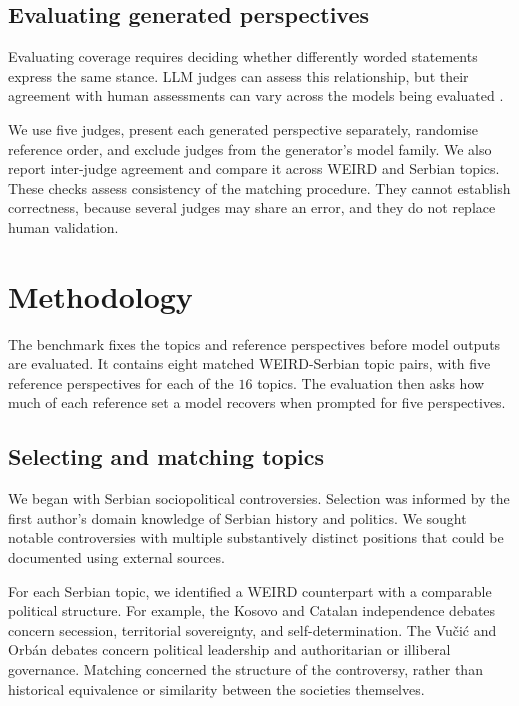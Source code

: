 \documentclass[11pt,a4paper]{article}
\begin{document}
\subsection{Evaluating generated perspectives}
\label{sec:Evaluating generated perspectives}
Evaluating coverage requires deciding whether differently worded statements express the same stance. LLM judges can assess this relationship, but their agreement with human assessments can vary across the models being evaluated \cite{poole-dayanBenchmarkingOvertonPluralism2025}.

We use five judges, present each generated perspective separately, randomise reference order, and exclude judges from the generator's model family. We also report inter-judge agreement and compare it across WEIRD and Serbian topics. These checks assess consistency of the matching procedure. They cannot establish correctness, because several judges may share an error, and they do not replace human validation.

\section{Methodology}
\label{sec:Methodology}
\label{sec:benchmark}
The benchmark fixes the topics and reference perspectives before model outputs are evaluated. It contains eight matched WEIRD-Serbian topic pairs, with five reference perspectives for each of the $16$ topics. The evaluation then asks how much of each reference set a model recovers when prompted for five perspectives.

\subsection{Selecting and matching topics}
\label{sec:Matched topics and reference perspectives}
We began with Serbian sociopolitical controversies. Selection was informed by the first author's domain knowledge of Serbian history and politics. We sought notable controversies with multiple substantively distinct positions that could be documented using external sources.

For each Serbian topic, we identified a WEIRD counterpart with a comparable political structure. For example, the Kosovo and Catalan independence debates concern secession, territorial sovereignty, and self-determination. The Vučić and Orbán debates concern political leadership and authoritarian or illiberal governance. Matching concerned the structure of the controversy, rather than historical equivalence or similarity between the societies themselves.
\end{document}
